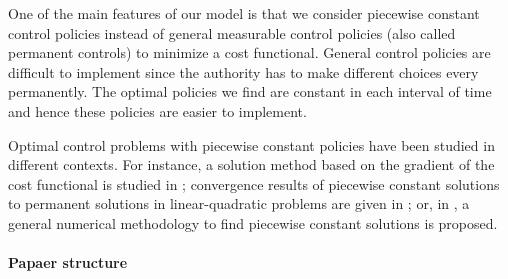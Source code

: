 One of the main features of our model is that we consider piecewise constant control policies instead of general measurable control policies (also called permanent controls) to minimize a cost functional. General control policies are difficult to implement since the authority has to make different choices every permanently. The optimal policies we find are constant in each interval of time and hence these policies are easier to implement. 

Optimal control problems with piecewise constant policies have been studied in different contexts. For instance, a solution method based on the gradient of the cost functional is studied in \cite{MR3223602}; convergence results of  piecewise constant solutions to permanent solutions in linear-quadratic problems are given in \cite{MR3627992}; or, in \cite{CANTUNetAl}, a general numerical methodology to find piecewise constant solutions is proposed. 

\paragraph{Papaer structure}